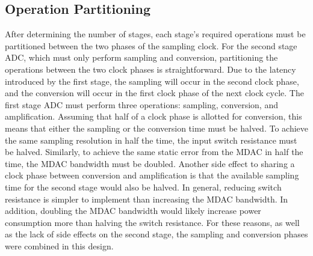 \subsection{Operation Partitioning}
After determining the number of stages, each stage's required operations must be partitioned between the two phases of the sampling clock. For the second stage ADC, which must only perform sampling and conversion, partitioning the operations between the two clock phases is straightforward. Due to the latency introduced by the first stage, the sampling will occur in the second clock phase, and the conversion will occur in the first clock phase of the next clock cycle. The first stage ADC must perform three operations: sampling, conversion, and amplification. Assuming that half of a clock phase is allotted for conversion, this means that either the sampling or the conversion time must be halved. To achieve the same sampling resolution in half the time, the input switch resistance must be halved. Similarly, to achieve the same static error from the MDAC in half the time, the MDAC bandwidth must be doubled. Another side effect to sharing a clock phase between conversion and amplification is that the available sampling time for the second stage would also be halved. In general, reducing switch resistance is simpler to implement than increasing the MDAC bandwidth. In addition, doubling the MDAC bandwidth would likely increase power consumption more than halving the switch resistance. For these reasons, as well as the lack of side effects on the second stage, the sampling and conversion phases were combined in this design.
